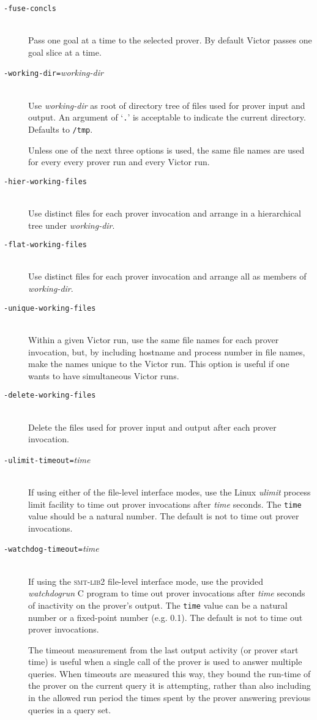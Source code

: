 \documentclass[12pt,fleqn]{article}
\newcommand{\zthree}{\textsc{Z}3}
\newcommand{\smtlib}{\textsc{smt-lib}}
\newcommand{\optionb}[1]{\item[\texttt{-{#1}}]\ \\}
\newcommand{\optionv}[2]{\item[\texttt{-{#1}=}\mdseries\textit{#2}]\ \\}
\begin{document}
\begin{description}
\optionb{fuse-concls} 
  Pass one goal at a time to the selected prover.  By default Victor
  passes one goal slice at a time.

\optionv{working-dir}{working-dir} 
  Use \textit{working-dir} as root of directory tree of files used for prover
  input and output.   An argument of  `\texttt{.}' is acceptable to indicate
  the current directory.  Defaults to \texttt{/tmp}.  

  Unless one of the next three options is used, the same file
  names are used for every every prover run and every Victor run.

\optionb{hier-working-files}
   Use distinct files for each prover invocation and arrange in a
   hierarchical tree under \emph{working-dir}.

\optionb{flat-working-files}
   Use distinct files for each prover invocation and arrange all as 
   members of \emph{working-dir}.


\optionb{unique-working-files}
  Within a given Victor run, use the same file names for each prover
  invocation, but, by including hostname and process
  number in file names, make the names unique to the Victor run.
  This option is useful if one wants to have simultaneous Victor runs.

\optionb{delete-working-files}
  Delete the files used for prover input and output after
  each prover invocation.

\optionv{ulimit-timeout}{time}
  If using either of the file-level interface modes, 
   use the Linux 
  \emph{ulimit} process limit facility to time out
  prover invocations after \emph{time} seconds.  The \texttt{time} value 
  should be a natural number.
  The default is not to time out prover invocations.

\optionv{watchdog-timeout}{time}
  If using the \smtlib{}2 file-level interface mode, use the provided
  \emph{watchdogrun} C program to time out prover invocations after
  \emph{time} seconds of inactivity on the prover's output.  The
  \texttt{time} value can be a natural number or a fixed-point
  number (e.g. 0.1).  The default is not to time out prover invocations.

  The timeout measurement from the last output activity (or prover
  start time) is useful when a single call of the prover is used to
  answer multiple queries.  When timeouts are measured this way, they
  bound the run-time of the prover on the current query it is
  attempting, rather than also including in the allowed run period the
  times spent by the prover answering previous queries in a query set.


\end{description}
\end{document}
